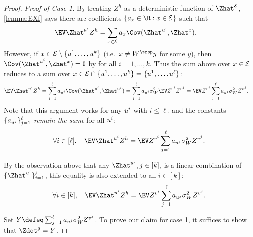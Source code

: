 \documentclass[main.tex]{subfiles}
\begin{document}
\begin{proof}
  \emph{Proof of Case 1.}
  By treating $Z^h$ as a deterministic function of $\Zhat^\Ee$, \cref{lemma:EXf} says there are coefficients $\{a_{\xx} \in \R: \xx \in \Ee\}$ such that
  \begin{align*}
  \EV \Zhat^{\uu^i} Z^h
    &=
      \sum_{\xx \in \Ee} a_{\xx} \Cov(\Zhat^{\uu^i}, \Zhat^\xx)
      .
  \end{align*}
  However, if $x \in \mathcal{E}\setminus \{u^1, \ldots, u^k\}$ (i.e.\ $\xx \ne W^\trsp y$ for some $y$), then $\Cov(\Zhat^{\uu^{i}}, \Zhat^\xx) = 0$ by  for all $i=1,\ldots,k$.
  Thus the sum above over $x\in\mathcal{E}$ reduces to a sum over $x\in \mathcal{E} \cap \{u^1, \ldots, u^k\} = \{u^1, \ldots, u^\ell\}$:
  \begin{align*}
  \EV  \Zhat^{\uu^i} Z^{h} 
    &=
      \sum_{j=1}^{\ell} a_{\uu^j} \Cov(\Zhat^{\uu^{i}}, \Zhat^{\uu^{j}})
    =
      \sum_{j=1}^{\ell} a_{\uu^j} \sigma_W^2
        \EV  Z^{\vv^i} Z^{\vv^j} 
    =
      \EV
        Z^{\vv^i}
        \sum_{j=1}^{\ell} a_{\uu^j} \sigma_W^2
          Z^{\vv^j}
      .
  \end{align*}
  Note that this argument works for any $u^i$ with $i \le \ell$, and the constants $\{a_{u^j}\}_{j=1}^{\ell}$ \emph{remain the same} for all $u^i$:
  \begin{equation*}
  \forall i \in [\ell],\quad
  \EV  \Zhat^{\uu^i} Z^{h} 
    =
      \EV
        Z^{\vv^i}
        \sum_{j=1}^{\ell} a_{\uu^j} \sigma_W^2
          Z^{\vv^j}
      .
  \end{equation*}

  By the observation above that any $\Zhat^{\uu^{j}}, j \in [k],$ is a linear combination of $\{\Zhat^{\uu^i}\}_{i=1}^{\ell}$, this equality is also extended to all $i \in [k]$:
  \begin{equation}
  \forall i \in [k],\quad
  \EV  \Zhat^{\uu^i} Z^{h} 
    =
      \EV
        Z^{\vv^i}
        \sum_{j=1}^{\ell} a_{\uu^j} \sigma_W^2
          Z^{\vv^j}
      .
      \label{eqn:partialAdjunction}
  \end{equation}

  Set $Y \defeq \sum_{j=1}^{\ell} a_{\uu^j} \sigma_W^2
  Z^{\vv^j}$.
  To prove our claim for case 1, it suffices to show that $\Zdot^{g} = Y$.


\end{proof}
\end{document}
